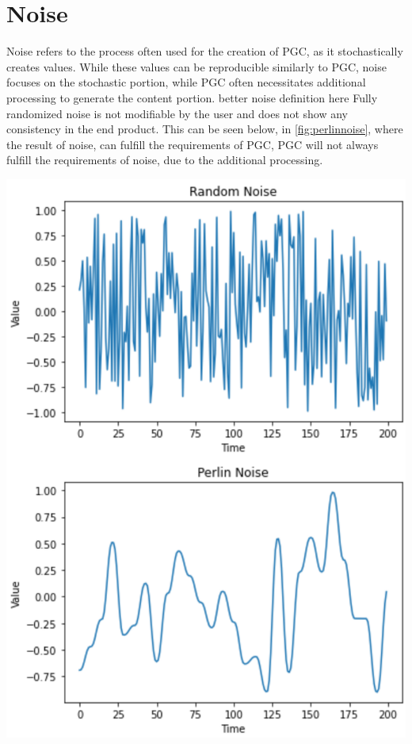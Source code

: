 \documentclass[10pt]{report}
\begin{document}
	\vspace{10pt}
	\let\clearpage\relax
	\chapter{Noise}
		Noise refers to the process often used for the creation of PGC, as it stochastically creates values. While these values can be reproducible similarly to PGC, noise focuses on the stochastic portion, while PGC often necessitates additional processing to generate the content portion. {better noise definition here} Fully randomized noise is not modifiable by the user and does not show any consistency in the end product. This can be seen below, in \autoref{fig:perlinnoise}, where the result of noise, can fulfill the requirements of PGC, PGC will not always fulfill the requirements of noise, due to the additional processing. 
		
		\begin{minipage}{\textwidth}
			\centering
			\includegraphics[scale=0.3]{perlinnoise}
			\label{fig:perlinnoise}
		\end{minipage}
	
\end{document}
